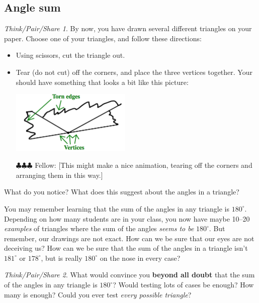 \documentclass[12pt, reqno]{amsart}
\theoremstyle{remark}
\newtheorem*{thinkpair*}{Think/Pair/Share}
\theoremstyle{definition}
\numberwithin{equation}{section}  %
\newcommand{\fellow}[1]{{\color{magenta} \sf $\clubsuit\clubsuit\clubsuit$ Fellow: [#1]}}
\begin{document}
\newpage


\subsection{Angle sum}

\begin{thinkpair*}
By now, you have drawn several different triangles on your paper.  Choose one of your triangles, and follow these directions:
\begin{itemize}
\item
Using scissors, cut the triangle out.  \\
\item
Tear (do not cut) off the corners, and place the three vertices together.  Your should have something that looks a bit like this picture:\\
\begin{center}
\includegraphics[height=3cm]{anglesum}
\end{center}
\fellow{This might make a nice animation, tearing off the corners and arranging them in this way.}
\end{itemize}
  What do you notice?  What does this suggest about the angles in a triangle? 
  \end{thinkpair*}
  
  
  
\bigskip
\bigskip
\bigskip

You may remember learning that the sum of the angles in any triangle is $180^\circ$.  Depending on how many students are in your class, you now have maybe 10--20 \emph{examples} of triangles where the sum of the angles \emph{seems to be} $180^\circ$.  But remember, our drawings are not exact.  How can we be sure that our eyes are not deceiving us?  How can we be sure that the sum of the angles in a triangle isn't   $181^\circ$ or $178^\circ$, but is really $180^\circ$ on the nose in every case?

\bigskip
\bigskip

\begin{thinkpair*}
What would convince you {\bf beyond all doubt} that the sum of the angles in any triangle is $180^\circ$?  Would testing lots of cases be enough?  How many is enough?  Could you ever test \emph{every possible triangle}?
\end{thinkpair*}
\end{document}
